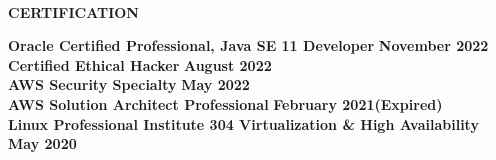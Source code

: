\begin{center}
    \hrulefill \\
    \begin{large}
        \textbf{CERTIFICATION} \\
    \end{large} 
\end{center}
\textbf{Oracle Certified Professional, Java SE 11 Developer} \hfill \textbf{November 2022} \\
\textbf{Certified Ethical Hacker} \hfill \textbf{August 2022} \\
\textbf{AWS Security Specialty} \hfill \textbf{May 2022} \\
\textbf{AWS Solution Architect Professional} \hfill \textbf{February 2021(Expired)} \\
\textbf{Linux Professional Institute 304 Virtualization \& High Availability} \hfill \textbf{May 2020}